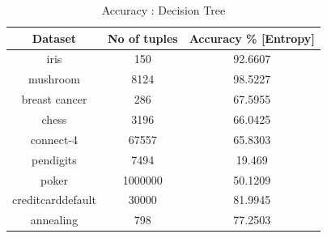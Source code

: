 \documentclass[12pt]{article}
\begin{document}
\begin{table}[H]
	\caption{Accuracy : Decision Tree}
	\centering
	\begin{tabular}{|c|c|c|}
		\hline
		\textbf{Dataset}  & \textbf{No of tuples} & \textbf{Accuracy \% {[}Entropy{]}} \\ \hline
		iris              & 150                   & 92.6607                            \\ \hline
		mushroom          & 8124                  & 98.5227                            \\ \hline
		breast cancer     & 286                   & 67.5955                            \\ \hline
		chess             & 3196                  & 66.0425                            \\ \hline
		connect-4         & 67557                 & 65.8303                            \\ \hline
		pendigits         & 7494                  & 19.469                             \\ \hline
		poker             & 1000000               & 50.1209                            \\ \hline
		creditcarddefault & 30000                 & 81.9945                            \\ \hline
		annealing         & 798                   & 77.2503                            \\ \hline
	\end{tabular}
\end{table}
\end{document}
